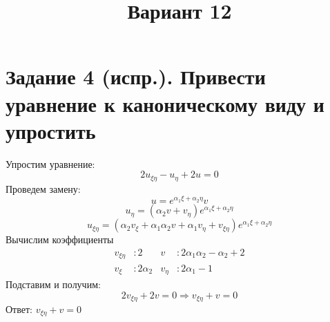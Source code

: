 \documentclass[a4paper,12pt]{article}
\begin{document}
\setcounter{page}{1}
\thispagestyle{empty}
\title{Вариант 12}
\date{}
\maketitle
\section{Задание 4 (испр.). Привести уравнение к каноническому виду и упростить}
Упростим уравнение:
$$2u_{\xi\eta} - u_\eta + 2u = 0$$
Проведем замену:
$$u = e^{\alpha_1\xi + \alpha_2\eta}v$$
$$u_\eta = (\alpha_2 v + v_\eta)e^{\alpha_1\xi + \alpha_2\eta}$$
$$u_{\xi\eta} = (\alpha_2v_\xi + \alpha_1\alpha_2 v + \alpha_1 v_\eta + v_{\xi\eta})e^{\alpha_1\xi + \alpha_2\eta}$$
Вычислим коэффициенты
\begin{align*}
    v_{\xi\eta} &: 2  &v &: 2\alpha_1\alpha_2 - \alpha_2 + 2 \\
    v_\xi &: 2\alpha_2 &v_\eta &: 2\alpha_1 - 1
\end{align*}
Подставим и получим:
$$2v_{\xi\eta} + 2v = 0 \Rightarrow v_{\xi\eta} + v = 0$$
Ответ: $v_{\xi\eta} + v = 0$
\end{document}
